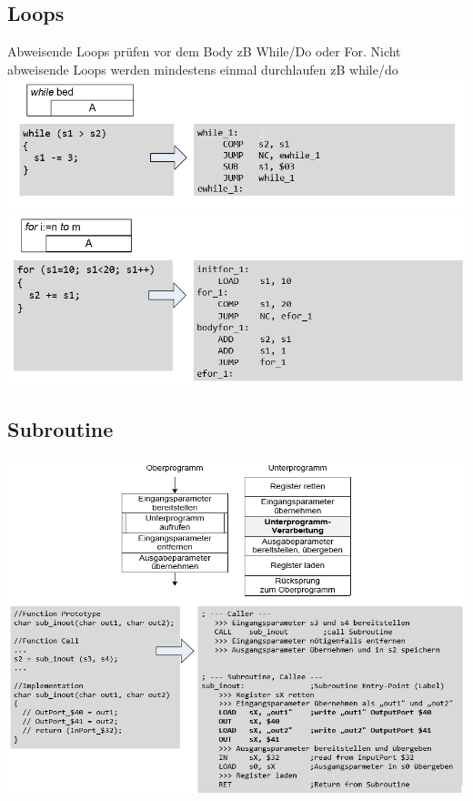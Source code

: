 \subsection{Loops}
Abweisende Loops prüfen vor dem Body zB While/Do oder For. Nicht abweisende Loops werden mindestens einmal durchlaufen zB while/do\\
\includegraphics[width=\linewidth]{Images/while}
\newpage
\includegraphics[width=\linewidth]{Images/for}

\subsection{Subroutine}
\includegraphics[width=\linewidth]{Images/subroutine}
